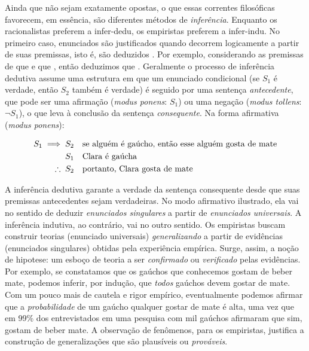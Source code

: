 \documentclass[./main.tex]{subfiles}
\begin{document}
\par Ainda que não sejam exatamente opostas, o que essas correntes filosóficas favorecem, em essência, são diferentes métodos de \textit{inferência}. Enquanto os racionalistas preferem a \gls{infer-dedu}, os empiristas preferem a \gls{infer-indu}. No primeiro caso, enunciados são justificados quando decorrem logicamente a partir de suas premissas, isto é, são deduzidos \cite{laird2010}. Por exemplo, considerando as premissas de que  e que , então deduzimos que . Geralmente o processo de inferência dedutiva assume uma estrutura em que um enunciado condicional (se $S_1$ é verdade, então $S_2$ também é verdade) é seguido por uma sentença \textit{antecedente}, que pode ser uma afirmação (\textit{modus ponens}: $S_1$) ou uma negação (\textit{modus tollens}: $\neg S_1$), o que leva à conclusão da sentença \textit{consequente}. Na forma afirmativa (\textit{modus ponens}):
\begin{linenomath*}
    \begin{align*}
        S_1 \implies S_2 & \quad \textnormal{se alguém é gaúcho, então esse alguém gosta de mate} \\
        S_1 & \quad \textnormal{Clara é gaúcha}\\
        \therefore\;S_2 & \quad \textnormal{portanto, Clara gosta de mate}
    \end{align*}
\end{linenomath*}
A inferência dedutiva garante a verdade da sentença consequente desde que suas premissas antecedentes sejam verdadeiras. No modo afirmativo ilustrado, ela vai no sentido de deduzir \textit{enunciados singulares} a partir de \textit{enunciados universais}. A inferência indutiva, ao contrário, vai no outro sentido. Os empiristas buscam construir teorias (enunciado universais) \textit{generalizando} a partir de evidências (enunciados singulares) obtidas pela experiência empírica. Surge, assim, a noção de \gls{hipotese}: um esboço de teoria a ser \textit{confirmado} ou \textit{verificado} pelas evidências. Por exemplo, se constatamos que os gaúchos que conhecemos gostam de beber mate, podemos inferir, por indução, que \textit{todos} gaúchos devem gostar de mate. Com um pouco mais de cautela e rigor empírico, eventualmente podemos afirmar que a \textit{probabilidade} de um gaúcho qualquer gostar de mate é alta, uma vez que em 99\% dos entrevistados em uma pesquisa com mil gaúchos afirmaram que sim, gostam de beber mate. A observação de fenômenos, para os empiristas, justifica a construção de generalizações que são plausíveis ou \textit{prováveis}.
\end{document}
